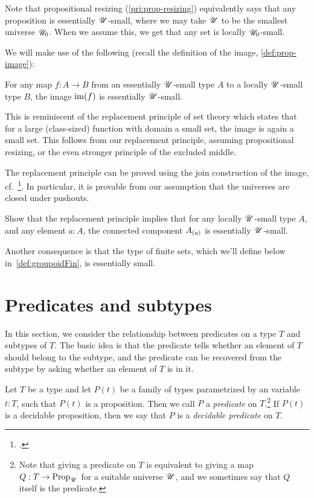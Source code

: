 \begin{remark}
  Note that propositional resizing (\cref{pri:prop-resizing})
  equivalently says that any proposition is essentially ${\mathscr{U}}$-small,
  where we may take ${\mathscr{U}}$ to be the smallest universe ${\mathscr{U}}_0$.
  When we assume this, we get that any set is locally ${\mathscr{U}}_0$-small.
\end{remark}

We will make use of the following (recall the definition of the image, \cref{def:prop-image}):
\begin{principle}[Replacement]
  \label{pri:replacement}
  For any map $f : A \to B$
  from an essentially ${\mathscr{U}}$-small type $A$
  to a locally ${\mathscr{U}}$-small type $B$,
  the image $\im(f)$ is essentially ${\mathscr{U}}$-small.
\end{principle}
This is reminiscent of the replacement principle of set theory which states
that for a large (class-sized) function with domain a small set,
the image is again a small set.
This follows from our replacement principle,
assuming propositional resizing, or the even stronger principle of the excluded middle.

The replacement principle can be proved using the join construction of the image, cf.~\citeauthor{Rijke-Join}\footcite{Rijke-Join}.
In particular, it is provable from our assumption that the universes
are closed under pushouts.
\begin{xca}\label{xca:comp-loc-small-ess-small}
  Show that the replacement principle implies that for any locally ${\mathscr{U}}$-small type $A$,
  and any element $a:A$,
  the connected component ${{A}_{\left(a\right)}}$ is essentially ${\mathscr{U}}$-small.
\end{xca}
Another consequence is that the type of finite sets, which we'll define below
in~\cref{def:groupoidFin}, is essentially small.


\section{Predicates and subtypes}
\label{sec:subtype}

In this section, we consider the relationship between predicates on a type $T$ and subtypes of $T$.  The basic idea is that the predicate tells
whether an element of $T$ should belong to the subtype, and the predicate can be recovered from the subtype by asking whether an element of $T$
is in it.

\begin{definition}\label{def:predicate}
  Let $T$ be a type and let $P(t)$ be a family of types parametrized by an variable $t:T$, such that $P(t)$ is a proposition.
  Then we call $P$ a \emph{predicate} on $T$.\footnote{%
    Note that giving a predicate on $T$ is
    equivalent to giving a map $Q: T\to\mathrm{Prop}_{\mathscr{U}}$ for a suitable universe ${\mathscr{U}}$,
    and we sometimes say that $Q$ itself is the predicate.}
  If $P(t)$ is a decidable proposition,
  then we say that $P$ is a \emph{decidable predicate} on $T$.
\end{definition}

